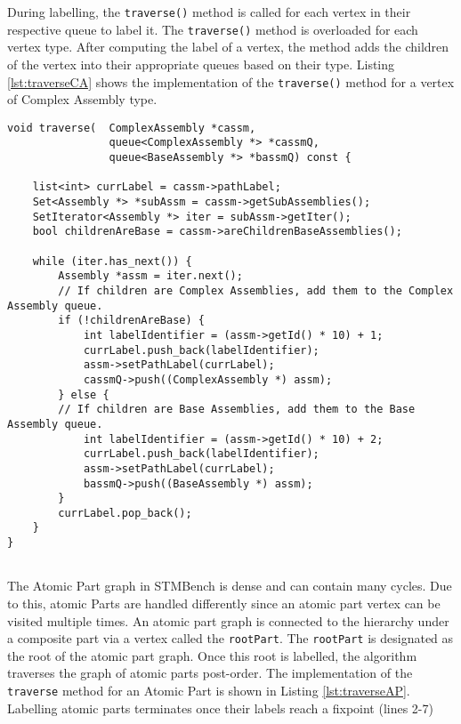 During labelling, the \texttt{traverse()} method is called for each vertex in their respective queue to label it. The \texttt{traverse()} method is overloaded for each vertex type. After computing the label of a vertex, the method adds the children of the vertex into their appropriate queues based on their type. Listing \ref{lst:traverseCA} shows the implementation of the \texttt{traverse()} method for a vertex of Complex Assembly type.

\begin{lstlisting}[caption={Labelling a complex assembly},label={lst:traverseCA}]
void traverse(  ComplexAssembly *cassm, 
                queue<ComplexAssembly *> *cassmQ, 
                queue<BaseAssembly *> *bassmQ) const {

    list<int> currLabel = cassm->pathLabel;
    Set<Assembly *> *subAssm = cassm->getSubAssemblies();
    SetIterator<Assembly *> iter = subAssm->getIter();
    bool childrenAreBase = cassm->areChildrenBaseAssemblies();

    while (iter.has_next()) {
        Assembly *assm = iter.next();
        // If children are Complex Assemblies, add them to the Complex Assembly queue.
        if (!childrenAreBase) {
            int labelIdentifier = (assm->getId() * 10) + 1;
            currLabel.push_back(labelIdentifier);
            assm->setPathLabel(currLabel);
            cassmQ->push((ComplexAssembly *) assm);
        } else {
        // If children are Base Assemblies, add them to the Base Assembly queue.
            int labelIdentifier = (assm->getId() * 10) + 2;
            currLabel.push_back(labelIdentifier);
            assm->setPathLabel(currLabel);
            bassmQ->push((BaseAssembly *) assm);
        }
        currLabel.pop_back();
    }
}


\end{lstlisting}



The Atomic Part graph in STMBench is dense and can contain many cycles. Due to this, atomic Parts are handled differently since an atomic part vertex can be visited multiple times. An atomic part graph is connected to the hierarchy under a composite part via a vertex called the \texttt{rootPart}. The \texttt{rootPart} is designated as the root of the atomic part graph. Once this root is labelled, the algorithm traverses the graph of atomic parts post-order. The implementation of the \texttt{traverse} method for an Atomic Part is shown in Listing \ref{lst:traverseAP}. Labelling atomic parts terminates once their labels reach a fixpoint (lines 2-7)

